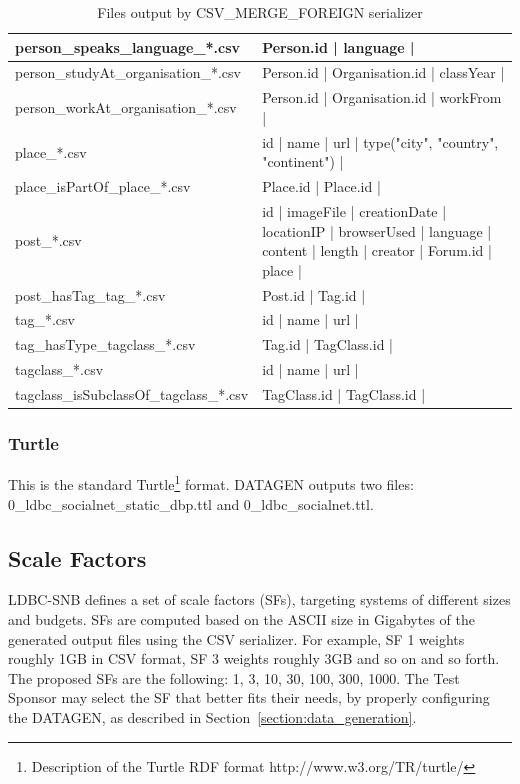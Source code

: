 \begin{landscape}
\begin{table}[t]
\begin{tabular}{|p{5cm}|p{19cm}|}
            \hline
            person\_speaks\_language\_*.csv & Person.id | language |\\
            \hline
            person\_studyAt\_organisation\_*.csv & Person.id | Organisation.id | classYear |\\  
            \hline
            person\_workAt\_organisation\_*.csv &  Person.id | Organisation.id | workFrom |\\ 
            \hline
            place\_*.csv & id | name | url | type({"city", "country", "continent"}) |\\
            \hline
            place\_isPartOf\_place\_*.csv & Place.id | Place.id |\\
            \hline
            post\_*.csv & id | imageFile | creationDate | locationIP | browserUsed | language | content | length | creator | Forum.id | place |\\
            \hline
            post\_hasTag\_tag\_*.csv & Post.id | Tag.id |\\
            \hline
            tag\_*.csv & id | name | url | \\
            \hline
            tag\_hasType\_tagclass\_*.csv & Tag.id | TagClass.id |\\
            \hline
            tagclass\_*.csv & id | name | url | \\
            \hline
            tagclass\_isSubclassOf\_tagclass\_*.csv & TagClass.id | TagClass.id |\\
            \hline
        \end{tabular}
        \caption{Files output by CSV\_MERGE\_FOREIGN serializer}
        \label{table:csv_merge_foreign}
\end{table}
\end{landscape}

\subsubsection{Turtle}

This is the standard Turtle\footnote{Description of
the Turtle RDF format http://www.w3.org/TR/turtle/} format. DATAGEN outputs
two files: 0\_ldbc\_socialnet\_static\_dbp.ttl and  0\_ldbc\_socialnet.ttl.

\subsection{Scale Factors}

LDBC-SNB defines a set of scale factors (SFs), targeting systems of different
sizes and budgets.  SFs are computed based on the ASCII size in Gigabytes of
the generated output files using the CSV serializer. For example, SF 1 weights roughly 1GB in CSV
format, SF 3 weights roughly 3GB and so on and so forth.  The proposed SFs are
the following: 1, 3, 10, 30, 100, 300, 1000. The Test Sponsor may select the SF
that better fits their needs, by properly configuring the DATAGEN, as described
in Section~\ref{section:data_generation}.


